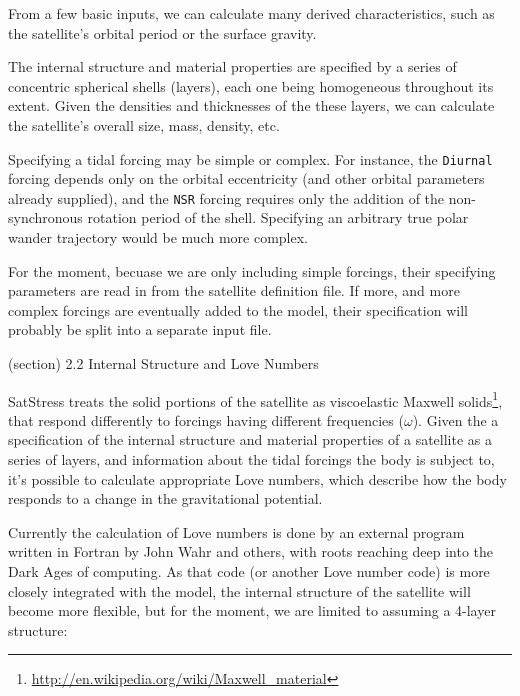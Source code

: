     From a few basic inputs, we can calculate many derived characteristics,
    such as the satellite's orbital period or the surface gravity.

    The internal structure and material properties are specified by a 
    series of concentric spherical shells (layers), each one being 
    homogeneous throughout its extent.  Given the densities and thicknesses
    of the these layers, we can calculate the satellite's overall size, 
    mass, density, etc.

    Specifying a tidal forcing may be simple or complex.  For instance, the
    \texttt{Diurnal} forcing depends only on the orbital eccentricity (and 
    other orbital parameters already supplied), and the \texttt{NSR} 
    forcing requires only the addition of the non-synchronous rotation 
    period of the shell.  Specifying an arbitrary true polar wander 
    trajectory would be much more complex.

    For the moment, becuase we are only including simple forcings, their 
    specifying parameters are read in from the satellite definition file.  
    If more, and more complex forcings are eventually added to the model, 
    their specification will probably be split into a separate input file.

  (section) 2.2 Internal Structure and Love Numbers

    SatStress treats the solid portions of the satellite as viscoelastic 
    Maxwell 
    solids\footnote{\href{http://en.wikipedia.org/wiki/Maxwell_material}{http://en.wikipedia.org/wiki/Maxwell\_material}},
    that respond differently to forcings having different frequencies 
    (\(\omega\)).  Given the a specification of the internal structure and 
    material properties of a satellite as a series of layers, and 
    information about the tidal forcings the body is subject to, it's 
    possible to calculate appropriate Love numbers, which describe how the 
    body responds to a change in the gravitational potential.

    Currently the calculation of Love numbers is done by an external 
    program written in Fortran by John Wahr and others, with roots reaching
    deep into the Dark Ages of computing.  As that code (or another Love 
    number code) is more closely integrated with the model, the internal 
    structure of the satellite will become more flexible, but for the 
    moment, we are limited to assuming a 4-layer structure:

